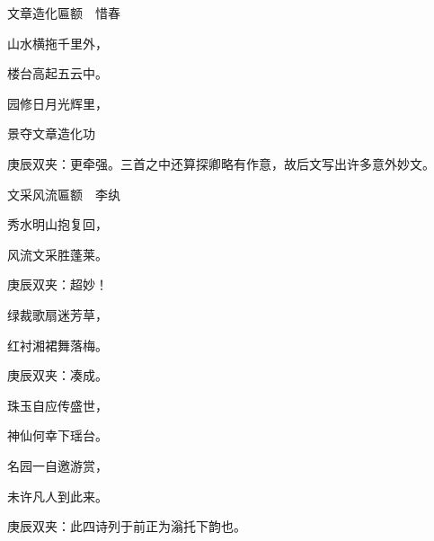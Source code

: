 \begin{poem}
    \begin{pl}文章造化匾额　惜春\end{pl}

    \begin{pl}山水横拖千里外，\end{pl}

    \begin{pl}楼台高起五云中。\end{pl}

    \begin{pl}园修日月光辉里，\end{pl}

    \begin{pl}景夺文章造化功\end{pl}
    \begin{note}庚辰双夹：更牵强。三首之中还算探卿略有作意，故后文写出许多意外妙文。\end{note}
\end{poem}


\begin{poem}
    \begin{pl}文采风流匾额　李纨\end{pl}

    \begin{pl}秀水明山抱复回，\end{pl}

    \begin{pl}风流文采胜蓬莱。\end{pl}
    \begin{note}庚辰双夹：超妙！\end{note}

    \begin{pl}绿裁歌扇迷芳草，\end{pl}

    \begin{pl}红衬湘裙舞落梅。\end{pl}
    \begin{note}庚辰双夹：凑成。\end{note}

    \begin{pl}珠玉自应传盛世，\end{pl}

    \begin{pl}神仙何幸下瑶台。\end{pl}

    \begin{pl}名园一自邀游赏，\end{pl}

    \begin{pl}未许凡人到此来。\end{pl}
    \begin{note}庚辰双夹：此四诗列于前正为滃托下韵也。\end{note}

\end{poem}


